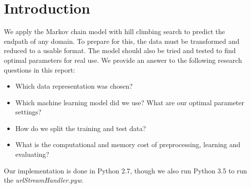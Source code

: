 \section{Introduction}\label{sec:intro}

We apply the Markov chain model with hill climbing search to predict the endpath of any domain. To prepare for this, the data must be transformed and reduced to a usable format. The model should also be tried and tested to find optimal parameters for real use. We provide an answer to the following research questions in this report:
\begin{itemize}
	\item Which data representation was chosen?
	\item Which machine learning model did we use? What are our optimal parameter settings?
	\item How do we split the training and test data?
	\item What is the computational and memory cost of preprocessing, learning and evaluating?
\end{itemize}
Our implementation is done in Python 2.7, though we also run Python 3.5 to run the \textit{urlStreamHandler.pyw}.